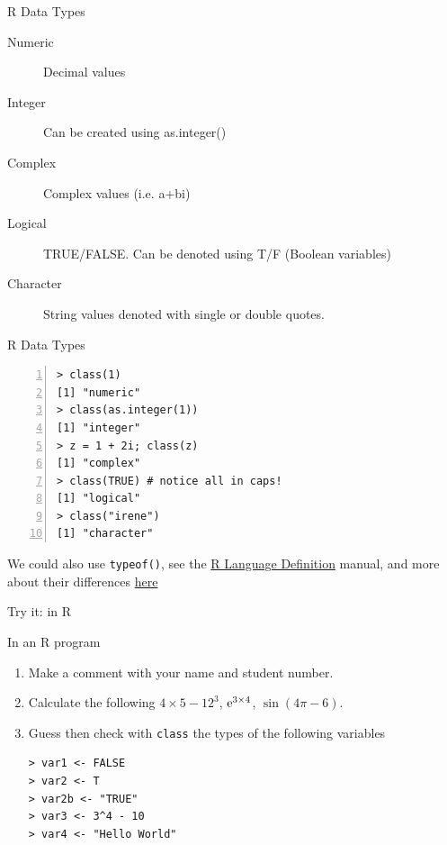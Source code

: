 \documentclass[xcolor=svgnames, 10pt]{beamer}
\begin{document}



\begin{frame}{R Data Types}
\begin{description}
\item[Numeric] Decimal values
\item[Integer] Can be created using as.integer()
\item[Complex] Complex values  (i.e. a+bi)
\item[Logical] TRUE/FALSE. Can be denoted using T/F (Boolean variables)
\item[Character] String values denoted with single or double quotes.  

\end{description}


\end{frame}



\begin{frame}[fragile]{R Data Types}
\begin{Verbatim}[xleftmargin=2em, xrightmargin=1.5em, frame=single, numbers=left, label=Typing checking in R, framesep=0.5em]
> class(1)
[1] "numeric"
> class(as.integer(1))
[1] "integer"
> z = 1 + 2i; class(z)
[1] "complex"
> class(TRUE) # notice all in caps! 
[1] "logical"
> class("irene")
[1] "character"
\end{Verbatim}
We could also use {\tt typeof()}, see the \href{https://stat.ethz.ch/R-manual/R-devel/doc/manual/R-lang.html#Objects}{R Language Definition} manual, and more about their differences \href{http://rfunction.com/archives/770}{here}
\end{frame}



\begin{frame}[fragile]{Try it: in R}
\begin{question}
In an R program
\begin{enumerate}
\item Make a comment with your name and student number.
\item Calculate the following $4 \times 5 - 12^3$, ${\rm e}^{3 \times 4}$, $\sin(4\pi-6)$.
\item Guess then check with \texttt{class} the types of the following variables
\begin{Verbatim}[xleftmargin=2em, xrightmargin=1.5em, framesep=0.5em]
> var1 <- FALSE
> var2 <- T
> var2b <- "TRUE"
> var3 <- 3^4 - 10
> var4 <- "Hello World"
\end{Verbatim}
\end{enumerate}
\end{question}
\end{frame}
\end{document}
